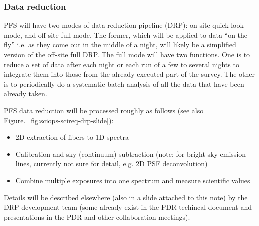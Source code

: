 \documentclass[a4paper,notitlepage]{article}
\begin{document}
\subsubsection{Data reduction}
\label{datareduction}

PFS will have two modes of data reduction pipeline (DRP): on-site
quick-look mode, and off-site full mode. The former, which will be
applied to data ``on the fly'' i.e. as they come out in the middle of a
night, will likely be a simplified version of the off-site full DRP. The
full mode will have two functions. One is to reduce a set of data after
each night or each run of a few to several nights to integrate them into
those from the already executed part of the survey. The other is to
periodically do a systematic batch analysis of all the data that have
been already taken.

PFS data reduction will be processed roughly as follows (see also
Figure.~\ref{fig:sciops-scireq-drp-slide}): 

\begin{itemize}
  \item 2D extraction of fibers to 1D spectra
  \item Calibration and sky (continuum) subtraction (note: for bright sky 
    emission lines, currently not sure for detail, e.g. 2D PSF deconvolution)
  \item Combine multiple exposures into one spectrum and measure scientific 
    values
\end{itemize}

Details will be described elsewhere (also in a slide attached to this note) 
by the DRP development team (some
already exist in the PDR techincal document and presentations in the PDR
and other collaboration meetings).

\end{document}
